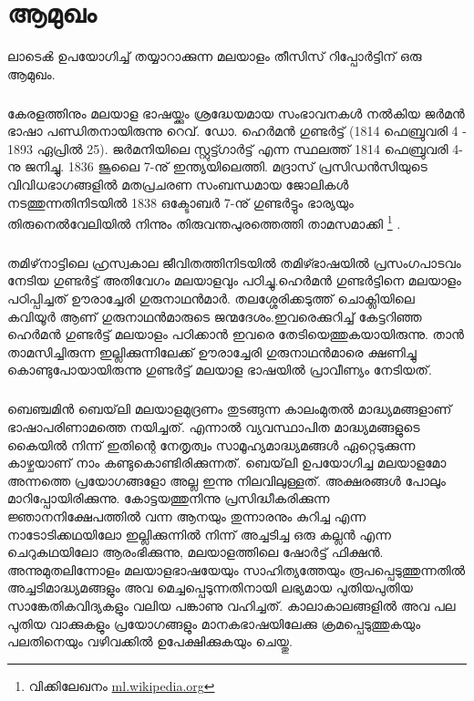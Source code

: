  
\chapter{ആമുഖം}

ലാടെൿ ഉപയോഗിച്ച് തയ്യാറാക്കുന്ന മലയാളം തീസിസ് റിപ്പോർട്ടിന് ഒരു ആമുഖം.

\paragraph{}
 കേരളത്തിനും മലയാള ഭാഷയ്ക്കും ശ്രദ്ധേയമായ സംഭാവനകൾ നൽകിയ ജർമൻ ഭാഷാ പണ്ഡിതനായിരുന്നു റെവ്. ഡോ. ഹെർമൻ ഗുണ്ടർട്ട് (1814 ഫെബ്രുവരി 4 - 1893 ഏപ്രിൽ 25). ജർമനിയിലെ സ്റ്റുട്ട്ഗാർട്ട് എന്ന സ്ഥലത്ത് 1814 ഫെബ്രുവരി 4-നു ജനിച്ചു. 1836 ജൂലൈ 7-നു് ഇന്ത്യയിലെത്തി. മദ്രാസ് പ്രസിഡൻസിയുടെ വിവിധഭാഗങ്ങളിൽ മതപ്രചരണ സംബന്ധമായ ജോലികൾ നടത്തുന്നതിനിടയിൽ 1838 ഒക്ടോബർ 7-നു് ഗുണ്ടർട്ടും ഭാര്യയും തിരുനെൽവേലിയിൽ നിന്നും തിരുവന്തപുരത്തെത്തി താമസമാക്കി  \footnote{വിക്കിലേഖനം \url{ml.wikipedia.org}} .

\paragraph{}
തമിഴ്‌നാട്ടിലെ ഹ്രസ്വകാല ജീവിതത്തിനിടയിൽ തമിഴ്ഭാഷയിൽ പ്രസംഗപാടവം നേടിയ ഗുണ്ടർട്ട് അതിവേഗം മലയാളവും പഠിച്ചു.ഹെർമൻ ഗുണ്ടർട്ടിനെ മലയാളം പഠിപ്പിച്ചത് ഊരാച്ചേരി ഗുരുനാഥൻമാർ. തലശ്ശേരിക്കടുത്ത് ചൊക്ലിയിലെ കവിയൂർ ആണ് ഗുരുനാഥൻമാരുടെ ജന്മദേശം.ഇവരെക്കുറിച്ച് കേട്ടറിഞ്ഞ ഹെർമൻ ഗുണ്ടർട്ട് മലയാളം പഠിക്കാൻ ഇവരെ തേടിയെത്തുകയായിരുന്നു. താൻ താമസിച്ചിരുന്ന ഇല്ലിക്കുന്നിലേക്ക് ഊരാച്ചേരി ഗുരുനാഥൻമാരെ ക്ഷണിച്ചു കൊണ്ടുപോയായിരുന്നു ഗുണ്ടർട്ട് മലയാള ഭാഷയിൽ പ്രാവീണ്യം നേടിയത്. 

\paragraph{}
ബെഞ്ചമിൻ ബെയ്‌ലി മലയാളമുദ്രണം തുടങ്ങുന്ന കാലംമുതൽ മാദ്ധ്യമങ്ങളാണ് ഭാഷാപരിണാമത്തെ നയിച്ചത്. എന്നാൽ വ്യവസ്ഥാപിത മാദ്ധ്യമങ്ങളുടെ കൈയിൽ നിന്ന് ഇതിന്റെ നേതൃത്വം സാമൂഹ്യമാദ്ധ്യമങ്ങൾ ഏറ്റെടുക്കുന്ന കാഴ്ചയാണ് നാം കണ്ടുകൊണ്ടിരിക്കുന്നത്. ബെയ്‌ലി ഉപയോഗിച്ച മലയാളമോ അന്നത്തെ പ്രയോഗങ്ങളോ അല്ല ഇന്നു നിലവിലുള്ളത്. അക്ഷരങ്ങൾ പോലും മാറിപ്പോയിരിക്കുന്നു. കോട്ടയത്തുനിന്നു പ്രസിദ്ധീകരിക്കുന്ന ജ്ഞാനനിക്ഷേപത്തിൽ വന്ന ആനയും തുന്നാരനും കുറിച്ച എന്ന നാടോടിക്കഥയിലോ ഇല്ലിക്കുന്നിൽ നിന്ന് അച്ചടിച്ച ഒരു കല്ലൻ എന്ന ചെറുകഥയിലോ ആരംഭിക്കുന്നു, മലയാളത്തിലെ ഷോർട്ട് ഫിക്ഷൻ. അന്നുമുതലിന്നോളം മലയാളഭാഷയേയും സാഹിത്യത്തേയും രൂപപ്പെടുത്തുന്നതിൽ അച്ചടിമാദ്ധ്യമങ്ങളും അവ മെച്ചപ്പെടുന്നതിനായി ലഭ്യമായ പുതിയപുതിയ സാങ്കേതികവിദ്യകളും വലിയ പങ്കാണു വഹിച്ചത്. കാലാകാലങ്ങളിൽ അവ പല പുതിയ വാക്കുകളും പ്രയോഗങ്ങളും മാനകഭാഷയിലേക്കു ക്രമപ്പെടുത്തുകയും പലതിനെയും വഴിവക്കിൽ ഉപേക്ഷിക്കുകയും ചെയ്തു\cite{bailey}. 

